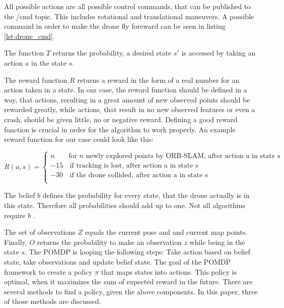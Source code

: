 	All possible actions are all possible control commands, that can be published to the /cmd topic. This includes rotational and translational maneuvers. A possible 
	command in order to make the drone fly foreward can be seen in listing \ref{lst:drone_cmd}. 
	
	The function $T$ returns the probability, a desired state $s'$ is accessed by taking an action $a$ in the state $s$. 
	
	The reward function $R$ returns a reward in the form of a real number for an action taken in a state. In our case, the reward function should be defined in a way, that actions, resulting 
	in a great amount of new observed points should be rewarded greatly, while actions, that result in no new observed features or even a crash, should be given little, no or negative reward. 
	Defining a good reward function is crucial in order for the algorithm to work properly. An example reward function for our case could look like this: 
	
	$$R(a,s) = \left\{
\begin{array}{ll}
n & \textrm{for } n \textrm{ newly explored points by ORB-SLAM,\ after action a in state s} \\
-15 & \, \textrm{if tracking is lost, after action a in state s}  \\
-30 & \, \textrm{if the drone collided, after action a in state s}  \\
\end{array}
\right. $$
	
	The belief $b$ defines the probability for every state, that the drone actually is in this state. Therefore all probabilities should add up to one. Not all algorithms 
	require $b$ \cite{belief}.
	
	The set of observations $Z$ equals the current pose and and current map points. Finally, $O$ returns the probability to make an observation $z$ while being in the state $s$.
	The POMDP is looping the following steps: Take action based on belief state, take observations and update belief state. The goal of the POMDP framework to 
	create a policy $\pi$ that maps states into actions. This policy is optimal, when it maximizes the sum of expected reward in the future. There are several 
	methods to find a policy, given the above components. In this paper, three of those methods are discussed. 
	

